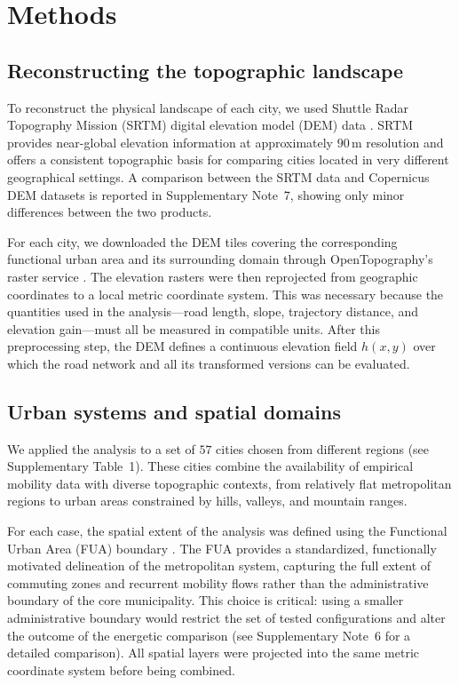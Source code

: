 \documentclass[twocolumn,amsmath,amssymb,floatfix,nature,shownopacs,footinbib,superscriptaddress]{revtex4-2}
\begin{document}
\section*{Methods}

\subsection*{Reconstructing the topographic landscape}

 To reconstruct the physical landscape of each city, we used Shuttle Radar Topography Mission (SRTM) digital elevation model (DEM) data \cite{farr2007}. SRTM provides near-global elevation information at approximately $90\,\mathrm{m}$ resolution and offers a consistent topographic basis for comparing cities located in very different geographical settings. A comparison between the SRTM data and Copernicus DEM datasets is reported in Supplementary Note~7, showing only minor differences between the two products.

For each city, we downloaded the DEM tiles covering the corresponding functional urban area and its surrounding domain through OpenTopography's raster service \cite{SRTM-OpenTopography}. The elevation rasters were then reprojected from geographic coordinates to a local metric coordinate system. This was necessary because the quantities used in the analysis---road length, slope, trajectory distance, and elevation gain---must all be measured in compatible units. After this preprocessing step, the DEM defines a continuous elevation field $h(x,y)$ over which the road network and all its transformed versions can be evaluated.

\subsection*{Urban systems and spatial domains}

We applied the analysis to a set of $57$ cities chosen from different regions (see Supplementary Table~1). These cities combine the availability of empirical mobility data with diverse topographic contexts, from relatively flat metropolitan regions to urban areas constrained by hills, valleys, and mountain ranges.

For each case, the spatial extent of the analysis was defined using the Functional Urban Area (FUA) boundary \cite{fua}. The FUA provides a standardized, functionally motivated delineation of the metropolitan system, capturing the full extent of commuting zones and recurrent mobility flows rather than the administrative boundary of the core municipality. This choice is critical: using a smaller administrative boundary would restrict the set of tested configurations and alter the outcome of the energetic comparison (see Supplementary Note~6 for a detailed comparison). All spatial layers were projected into the same metric coordinate system before being combined.
\end{document}
